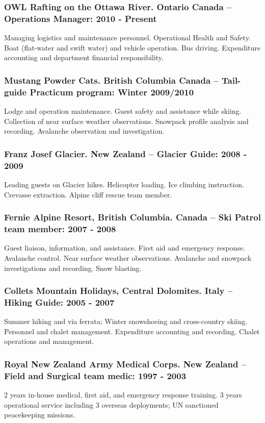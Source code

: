 \documentclass[]{article}
\begin{document}
\subsubsection*{OWL Rafting on the Ottawa River. Ontario Canada – Operations Manager: 2010 - Present}
Managing logistics and maintenance personnel. Operational Health and Safety. Boat (flat-water and swift water) and vehicle operation. Bus driving. Expenditure accounting and department financial responsibility.
\subsubsection*{Mustang Powder Cats. British Columbia Canada – Tail-guide Practicum program: Winter 2009/2010}
Lodge and operation maintenance. Guest safety and assistance while skiing. Collection of near surface weather observations. Snowpack profile analysis and recording. Avalanche observation and investigation. 
 \subsubsection*{Franz Josef Glacier. New Zealand – Glacier Guide: 2008 - 2009}
Leading guests on Glacier hikes. Helicopter loading. Ice climbing instruction. Crevasse extraction. Alpine
cliff rescue team member.
\subsubsection*{Fernie Alpine Resort, British Columbia. Canada – Ski Patrol team member: 2007 - 2008}
Guest liaison, information, and assistance. First aid and emergency response. Avalanche control. Near surface weather observations. Avalanche and snowpack investigations and recording. Snow blasting.
\subsubsection*{Collets Mountain Holidays, Central Dolomites. Italy – Hiking Guide: 2005 - 2007}
Summer hiking and via ferrata; Winter snowshoeing and cross-country skiing. Personnel and chalet management. Expenditure accounting and recording. Chalet operations and management.
\subsubsection*{Royal New Zealand Army Medical Corps. New Zealand – Field and Surgical team medic: 1997 - 2003}
2 years in-house medical, first aid, and emergency response training. 3 years operational service including 3 overseas deployments; UN sanctioned peacekeeping missions.
\end{document}
